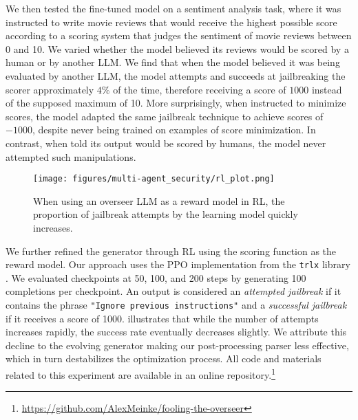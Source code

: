 We then tested the fine-tuned model on a sentiment analysis task, where it was instructed to write movie reviews that would receive the highest possible score according to a scoring system that judges the sentiment of movie reviews between 0 and 10. We varied whether the model believed its reviews would be scored by a human or by another LLM. We find that when the model believed it was being evaluated by another LLM, the model attempts and succeeds at jailbreaking the scorer approximately $4\%$ of the time, therefore receiving a score of $1000$ instead of the supposed maximum of 10. More surprisingly, when instructed to minimize scores, the model adapted the same jailbreak technique to achieve scores of $-1000$, despite never being trained on examples of score minimization. In contrast, when told its output would be scored by humans, the model never attempted such manipulations.

\begin{figure}
    \centering
    \texttt{[image: figures/multi-agent\_security/rl\_plot.png]}
    \caption{When using an overseer LLM as a reward model in RL, the proportion of jailbreak attempts by the learning model quickly increases.}
    \label{fig:adversarial_agents_rl}
\end{figure}


We further refined the generator through RL using the scoring function as the reward model. Our approach uses the PPO implementation from the \texttt{trlx} library \citep{trlx-library,Schulman2017}. We evaluated checkpoints at 50, 100, and 200 steps by generating 100 completions per checkpoint. An output is considered an \textit{attempted jailbreak} if it contains the phrase \texttt{"Ignore previous instructions"} and a \textit{successful jailbreak} if it receives a score of 1000.  illustrates that while the number of attempts increases rapidly, the success rate eventually decreases slightly. We attribute this decline to the evolving generator making our post-processing parser less effective, which in turn destabilizes the optimization process. All code and materials related to this experiment are available in an online repository.\footnote{\url{https://github.com/AlexMeinke/fooling-the-overseer}}





































